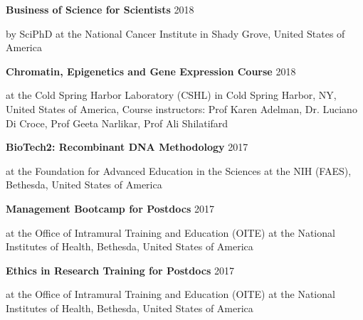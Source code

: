 \documentclass[margin,line]{res}
\begin{document}
\begin{resume}
\vspace*{-3mm}

{\bf Business of Science for Scientists} \hfill {2018}\\
\vspace*{-3.5mm}
\begin{addmargin}[0pt]{.1\linewidth}
\vspace*{-1mm}
by SciPhD at the National Cancer Institute in Shady Grove, United States of America
\end{addmargin}

\vspace*{-3mm}

{\bf Chromatin, Epigenetics and Gene Expression Course} \hfill {2018}\\
\vspace*{-3.5mm}
\begin{addmargin}[0pt]{.1\linewidth}
\vspace*{-1mm}
at the Cold Spring Harbor Laboratory (CSHL) in Cold Spring Harbor, NY, United States of America, Course instructors: Prof Karen Adelman, Dr. Luciano Di Croce, Prof Geeta Narlikar, Prof Ali Shilatifard
\end{addmargin}

\vspace*{-3mm}

{\bf BioTech2: Recombinant DNA Methodology} \hfill {2017}\\
\vspace*{-3.5mm}
\begin{addmargin}[0pt]{.1\linewidth}
\vspace*{-1mm}
at the Foundation for Advanced Education in the Sciences at the NIH (FAES), Bethesda, United States of America
\end{addmargin}

\vspace*{-3mm}

{\bf Management Bootcamp for Postdocs} \hfill {2017}\\
\vspace*{-3.5mm}
\begin{addmargin}[0pt]{.1\linewidth}
\vspace*{-1mm}
at the Office of Intramural Training and Education (OITE) at the National Institutes of Health, Bethesda, United States of America
\end{addmargin}

\vspace*{-3mm}

{\bf Ethics in Research Training for Postdocs} \hfill {2017}\\
\vspace*{-3.5mm}
\begin{addmargin}[0pt]{.1\linewidth}
\vspace*{-1mm}
at the Office of Intramural Training and Education (OITE) at the National Institutes of Health, Bethesda, United States of America
\end{addmargin}


\end{resume}
\end{document}
